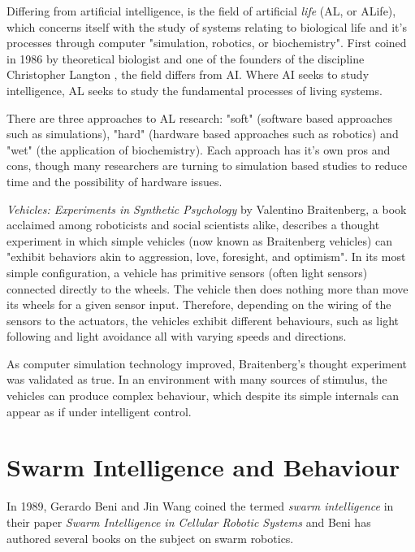 Differing from artificial intelligence, is the field of artificial \textit{life} (AL, or ALife), which concerns itself with the study of systems relating to biological life and it's processes through computer "simulation, robotics, or biochemistry". \cite{artlife} First coined in 1986 by theoretical biologist and one of the founders of the discipline Christopher Langton \cite{langton}, the field differs from AI. Where AI seeks to study intelligence, AL seeks to study the fundamental processes of living systems. 

There are three approaches to AL research: "soft" (software based approaches such as simulations), "hard" (hardware based approaches such as robotics) and "wet" (the application of biochemistry). Each approach has it's own pros and cons, though many researchers are turning to simulation based studies to reduce time and the possibility of hardware issues.

\textit{Vehicles: Experiments in Synthetic Psychology} by Valentino Braitenberg, a book acclaimed among roboticists and social scientists alike, describes a thought experiment in which simple vehicles (now known as Braitenberg vehicles) can "exhibit behaviors akin to aggression, love, foresight, and optimism". \cite{braitenberg1986vehicles} In its most simple configuration, a vehicle has primitive sensors (often light sensors) connected directly to the wheels. The vehicle then does nothing more than move its wheels for a given sensor input. Therefore, depending on the wiring of the sensors to the actuators, the vehicles exhibit different behaviours, such as light following and light avoidance all with varying speeds and directions. 

As computer simulation technology improved, Braitenberg's thought experiment was validated as true. In an environment with many sources of stimulus, the vehicles can produce complex behaviour, which despite its simple internals can appear as if under intelligent control.

\section{Swarm Intelligence and Behaviour}

In 1989, Gerardo Beni and Jin Wang coined the termed \textit{swarm intelligence} in their paper \textit{Swarm Intelligence in Cellular Robotic Systems} and Beni has authored several books on the subject on swarm robotics.


